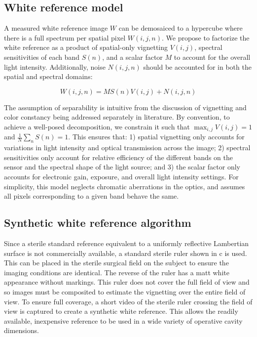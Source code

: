 % 
% 
% 
%
% 
% 
% 
% 
% 
% 
% 
% 
%
% 
% 
% 
% 
 

\subsection{White reference model}
\label{methodmodel}
A measured white reference image $W$ can be demosaiced to a hypercube where there is a full spectrum per spatial pixel $W(i,j,n)$. We propose to factorize the white reference as a product of spatial-only vignetting $V(i,j)$, spectral sensitivities of each band $S(n)$, and a scalar factor $M$ to account for the overall light intensity.
%
%
%
Additionally, noise $N(i,j,n)$ should be accounted for in both the spatial and spectral domains:
% 
\begin{linenomath*}
\begin{equation}
	W(i,j,n) = MS(n)V(i,j) + N(i,j,n)
\label{eq:modelling white references}
\end{equation}
\end{linenomath*}

The assumption of separability is intuitive from the discussion of vignetting and color constancy being addressed separately in literature\cite{Cho2014,Ayala2020,Jiang2019,Yu2004,Foster2011}.
%
%
%
%
% 
%
By convention, to achieve a well-posed decomposition, we  constrain  it such that $\max_{i,j}V(i,j) = 1$ and $\frac{1}{N} \sum_{n}S(n) = 1$. 
%
%
This ensures that: 1) spatial vignetting only accounts for variations in light intensity and optical transmission across the image; 2) spectral sensitivities only account for relative efficiency of the different bands on the sensor and the spectral shape of the light source; and 3) the scalar factor only accounts for electronic gain, exposure, and overall light intensity settings.
%
%
For simplicity, this model neglects chromatic aberrations in the optics, and assumes all pixels corresponding to a given band behave the same. 

\subsection{Synthetic white reference algorithm}
\label{methodalgorithm}
Since a sterile standard reference equivalent to a uniformly reflective Lambertian surface is not commercially available, a standard sterile ruler shown in c is used. This can be placed in the sterile surgical field on the subject to ensure the imaging conditions are identical. The reverse of the ruler has a matt white appearance without markings.
This ruler does not cover the full field of view and so images must be composited to estimate the vignetting over the entire field of view.
% 
To ensure full coverage, a short video of the sterile ruler crossing the field of view is captured to create a synthetic white reference. This allows the readily available, inexpensive reference to be used in a wide variety of operative cavity dimensions.
% 
% 
%    
%     
%     
%     
% 

